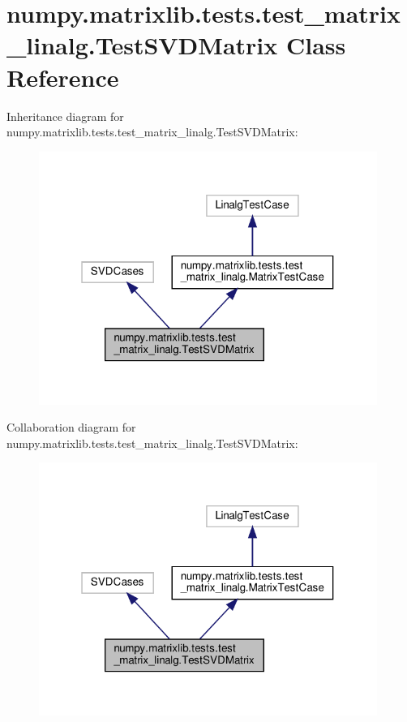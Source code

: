 \hypertarget{classnumpy_1_1matrixlib_1_1tests_1_1test__matrix__linalg_1_1TestSVDMatrix}{}\section{numpy.\+matrixlib.\+tests.\+test\+\_\+matrix\+\_\+linalg.\+Test\+S\+V\+D\+Matrix Class Reference}
\label{classnumpy_1_1matrixlib_1_1tests_1_1test__matrix__linalg_1_1TestSVDMatrix}


Inheritance diagram for numpy.\+matrixlib.\+tests.\+test\+\_\+matrix\+\_\+linalg.\+Test\+S\+V\+D\+Matrix\+:
\nopagebreak
\begin{figure}[H]
\begin{center}
\leavevmode
\includegraphics[width=313pt]{classnumpy_1_1matrixlib_1_1tests_1_1test__matrix__linalg_1_1TestSVDMatrix__inherit__graph}
\end{center}
\end{figure}


Collaboration diagram for numpy.\+matrixlib.\+tests.\+test\+\_\+matrix\+\_\+linalg.\+Test\+S\+V\+D\+Matrix\+:
\nopagebreak
\begin{figure}[H]
\begin{center}
\leavevmode
\includegraphics[width=313pt]{classnumpy_1_1matrixlib_1_1tests_1_1test__matrix__linalg_1_1TestSVDMatrix__coll__graph}
\end{center}
\end{figure}
